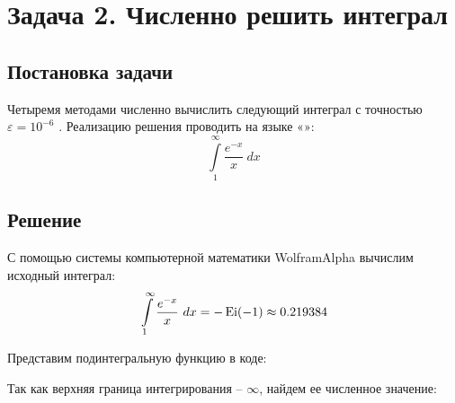 \def \task {
	\int\limits_1^{\infty} {\frac{ e^{-x} }{ x } ~ dx}
}

\newcommand{\accuracy}{
	$\varepsilon = 10^{-6} $
}

\section{Задача 2. Численно решить интеграл}
	\subsection{Постановка задачи}
		Четыремя методами численно вычислить следующий интеграл с 
		точностью \accuracy. 
		Реализацию решения проводить на языке «\Csh»:
			\[ \task \]

	\subsection{Решение}
	
		С помощью системы компьютерной математики WolframAlpha вычислим исходный интеграл:
		\[ \task = -\Ei{-1} \approx 0.219384 \]
		
		Представим подинтегральную функцию в коде:
		
		
		
		Так как верхняя граница интегрирования -- $ \infty $, найдем ее
		численное значение:
		
		
		
		\begin{enumerate}
			
			
			
			\newpage
			
		\end{enumerate}

